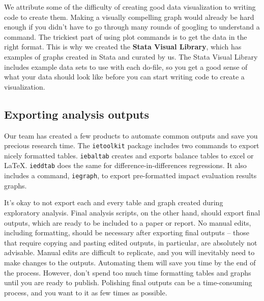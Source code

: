 We attribute some of the difficulty of creating good data visualization
to writing code to create them.
Making a visually compelling graph would already be hard enough if
you didn't have to go through many rounds of googling to understand a command.
The trickiest part of using plot commands is to get the data in the right format.
This is why we created the \textbf{Stata Visual Library},
which has examples of graphs created in Stata and curated by us.
The Stata Visual Library includes example data sets to use with each do-file,
so you get a good sense of what your data should look like
before you can start writing code to create a visualization.

\subsection{Exporting analysis outputs}

Our team has created a few products to automate common outputs and save you
precious research time.
The \texttt{ietoolkit} package includes two commands to export nicely formatted tables.
\texttt{iebaltab}
creates and exports balance tables to excel or {\LaTeX}.
\texttt{ieddtab}
does the same for difference-in-differences regressions.
It also includes a command, \texttt{iegraph},
to export pre-formatted impact evaluation results graphs.

It's okay to not export each and every table and graph created during exploratory analysis.
Final analysis scripts, on the other hand, should export final outputs,
which are ready to be included to a paper or report.
No manual edits, including formatting, should be necessary after exporting final outputs --
those that require copying and pasting edited outputs,
in particular, are absolutely not advisable.
Manual edits are difficult to replicate,
and you will inevitably need to make changes to the outputs.
Automating them will save you time by the end of the process.
However, don't spend too much time formatting tables and graphs until you are ready to publish.
Polishing final outputs can be a time-consuming process,
and you want to it as few times as possible.


